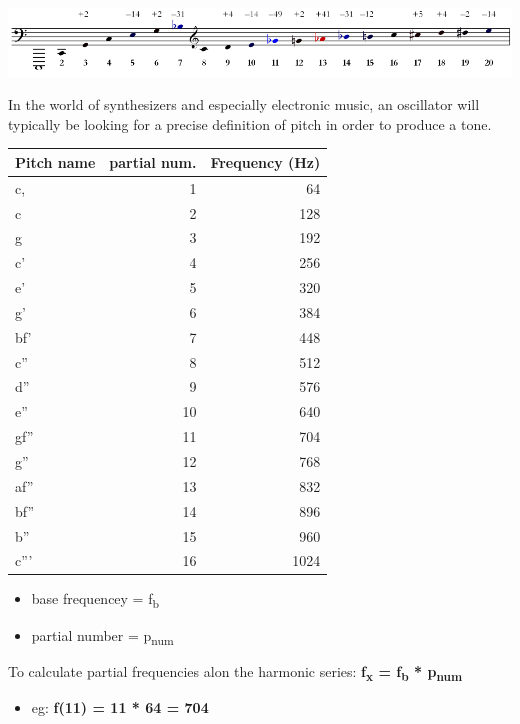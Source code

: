 \documentclass[11pt]{article}
\begin{document}
\begin{center}
\includegraphics[width=.9\linewidth]{./images/Harmonic_Series1.png}
\end{center}

In the world of synthesizers and especially electronic music, an
oscillator will typically be looking for a precise definition of pitch
in order to produce a tone. 

\begin{center}
\begin{tabular}{lrr}
Pitch name & partial num. & Frequency (Hz)\\
\hline
c, & 1 & 64\\
c & 2 & 128\\
g & 3 & 192\\
c' & 4 & 256\\
e' & 5 & 320\\
g' & 6 & 384\\
bf' & 7 & 448\\
c'' & 8 & 512\\
d'' & 9 & 576\\
e'' & 10 & 640\\
gf'' & 11 & 704\\
g'' & 12 & 768\\
af'' & 13 & 832\\
bf'' & 14 & 896\\
b'' & 15 & 960\\
c''' & 16 & 1024\\
\end{tabular}
\end{center}


\begin{itemize}
\item base frequencey = f\textsubscript{b}
\item partial number = p\textsubscript{num}
\end{itemize}

To calculate partial frequencies alon the harmonic series:
\textbf{f\textsubscript{x} = f\textsubscript{b} * p\textsubscript{num}}

\begin{itemize}
\item eg: \textbf{f(11) = 11 * 64 = 704}
\end{itemize}
\end{document}
